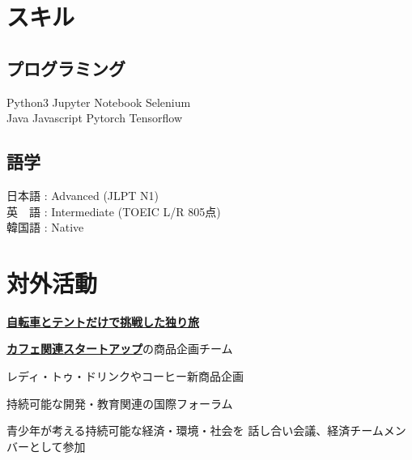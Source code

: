 \documentclass[]{deedy-resume-openfont}
\begin{document}
\begin{minipage}[t]{0.44\textwidth}

\section{スキル}
\subsection{プログラミング}
Python3 \textbullet{} Jupyter Notebook \textbullet{} Selenium \textbullet{} \\Java \textbullet{} Javascript \textbullet{} Pytorch  \textbullet{} Tensorflow \\
\sectionsep

\subsection{語学}
日本語 : Advanced (JLPT N1)\\
英　語 : Intermediate (TOEIC L/R 805点)\\
韓国語 : Native
\sectionsep

\section{対外活動}

\vspace{\topsep}
\begin{tightemize}
\item \textbf{\href{https://nhandsome.github.io/daily/2020/09/17/daily-bicycle-INTRO/}{自転車とテントだけで挑戦した独り旅}}
\end{tightemize}
\sectionsep


\begin{tightemize}
\item \textbf{\href{https://handium.co.kr/}{カフェ関連スタートアップ}}の商品企画チーム
\item レディ・トゥ・ドリンクやコーヒー新商品企画
\end{tightemize}
\sectionsep


\begin{tightemize}
\item 持続可能な開発・教育関連の国際フォーラム
\item 青少年が考える持続可能な経済・環境・社会を
話し合い会議、経済チームメンバーとして参加
\end{tightemize}
\sectionsep



\end{minipage}
\end{document}
